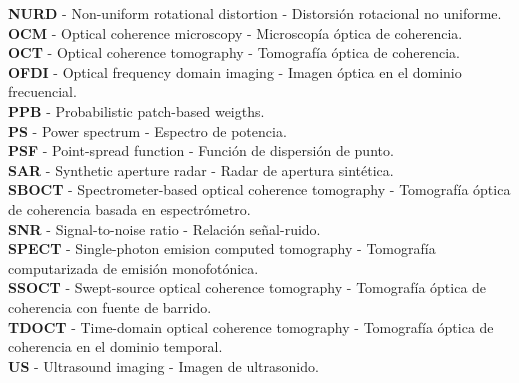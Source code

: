 \textbf{NURD} - Non-uniform rotational distortion - Distorsión rotacional no uniforme.\\
\textbf{OCM} - Optical coherence microscopy - Microscopía óptica de coherencia.\\ 
\textbf{OCT} - Optical coherence tomography - Tomografía óptica de coherencia.\\ 
\newpage
\thispagestyle{plain}
\noindent\textbf{OFDI} - Optical frequency domain imaging - Imagen óptica en el dominio frecuencial.\\ 
\textbf{PPB} - Probabilistic patch-based weigths.\\
\textbf{PS} - Power spectrum - Espectro de potencia.\\ \textbf{PSF} - Point-spread function - Función de dispersión de punto.\\ 
\textbf{SAR} - Synthetic aperture radar - Radar de apertura sintética.\\ 
\textbf{SBOCT} - Spectrometer-based optical coherence tomography - Tomografía óptica de coherencia basada en espectrómetro.\\ 
\textbf{SNR} - Signal-to-noise ratio - Relación señal-ruido.\\ 
\textbf{SPECT} - Single-photon emision computed tomography - Tomografía computarizada de emisión monofotónica.\\ 
\textbf{SSOCT} - Swept-source optical coherence tomography - Tomografía óptica de coherencia con fuente de barrido.\\ 
\textbf{TDOCT} - Time-domain optical coherence tomography - Tomografía óptica de coherencia en el dominio temporal.\\
\textbf{US} - Ultrasound imaging - Imagen de ultrasonido.\\  

